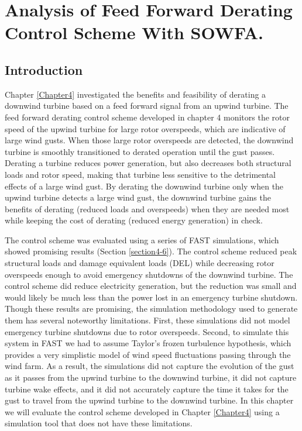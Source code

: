 
\chapter{Analysis of Feed Forward Derating Control Scheme With SOWFA.} %

\label{Chapter6} %



\section{Introduction} \label{section6-1}

Chapter \ref{Chapter4} investigated the benefits and feasibility of derating a downwind turbine based on a feed forward signal from an upwind turbine. The feed forward derating control scheme developed in chapter 4 monitors the rotor speed of the upwind turbine for large rotor overspeeds, which are indicative of large wind gusts. When those large rotor overspeeds are detected, the downwind turbine is smoothly transitioned to derated operation until the gust passes. Derating a turbine reduces power generation, but also decreases both structural loads and rotor speed, making that turbine less sensitive to the detrimental effects of a large wind gust. By derating the downwind turbine only when the upwind turbine detects a large wind gust, the downwind turbine gains the benefits of derating (reduced loads and overspeeds) when they are needed most while keeping the cost of derating (reduced energy generation) in check.

The control scheme was evaluated using a series of FAST simulations, which showed promising results (Section \ref{section4-6}). The control scheme reduced peak structural loads and damage equivalent loads (DEL) while decreasing rotor overspeeds enough to avoid emergency shutdowns of the downwind turbine. The control scheme did reduce electricity generation, but the reduction was small and would likely be much less than the power lost in an emergency turbine shutdown. Though these results are promising, the simulation methodology used to generate them has several noteworthy limitations. First, these simulations did not model emergency turbine shutdowns due to rotor overspeeds. Second, to simulate this system in FAST we had to assume Taylor's frozen turbulence hypothesis, which provides a very simplistic model of wind speed fluctuations passing through the wind farm. As a result, the simulations did not capture the evolution of the gust as it passes from the upwind turbine to the downwind turbine, it did not capture turbine wake effects, and it did not accurately capture the time it takes for the gust to travel from the upwind turbine to the downwind turbine. In this chapter we will evaluate the control scheme developed in Chapter \ref{Chapter4} using a simulation tool that does not have these limitations.

